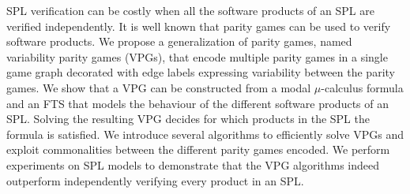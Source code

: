 SPL verification can be costly when all the software products of an SPL are verified independently. It is well known that parity games can be used to verify software products. We propose a generalization of parity games, named variability parity games (VPGs), that encode multiple parity games in a single game graph decorated with edge labels expressing variability between the parity games. We show that a VPG can be constructed from a modal $\mu$-calculus formula and an FTS that models the behaviour of the different software products of an SPL. Solving the resulting VPG decides for which products in the SPL the formula is satisfied. We introduce several algorithms to efficiently solve VPGs and exploit commonalities between the different parity games encoded. We perform experiments on SPL models to demonstrate that the VPG algorithms indeed outperform independently verifying every product in an SPL.